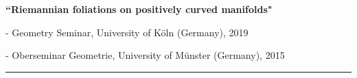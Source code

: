 \documentclass[10pt]{article}
\newenvironment{innerlist}[1][\enskip\textbullet]%
        {\begin{compactitem}[#1]}{\end{compactitem}}
\newcommand{\blankline}{\quad\pagebreak[2]}
\begin{document}
\blankline

\textbf{``Riemannian foliations on positively curved manifolds"}
\begin{innerlist}
\item[]- Geometry Seminar, University of K\"oln (Germany), 2019
\item[]- Oberseminar Geometrie, University of M\"unster (Germany), 2015
\end{innerlist}


%
%
%
%



\rule{\columnwidth}{.5pt}%
\end{document}
